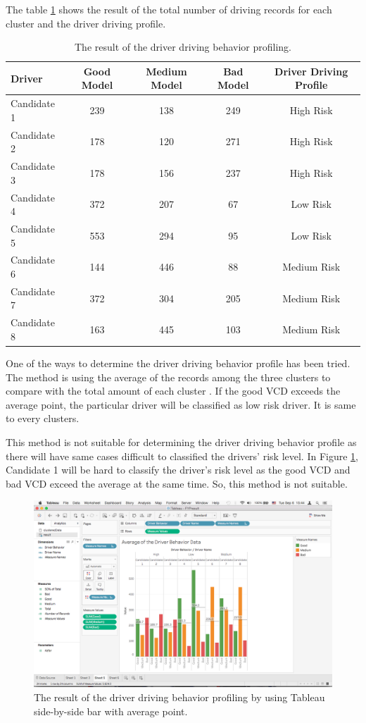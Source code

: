 The table \ref{tbl:result} shows the result of the total number of driving records for each cluster and the driver driving profile.

\begin{table}[h!]
\begin{tabular}{|l|c|c|c|c|}
\hline
Driver & Good Model & Medium Model & Bad Model & Driver Driving Profile \\

\hline
Candidate 1 & 239 & 138 & 249 & High Risk\\

\hline
Candidate 2 & 178 & 120 & 271 & High Risk\\
  
\hline
Candidate 3 & 178 & 156 & 237 & High Risk\\

\hline
Candidate 4 & 372 & 207 & 67 & Low Risk\\

\hline
Candidate 5 & 553 & 294 & 95 & Low Risk\\

\hline
Candidate 6 & 144 & 446 & 88 & Medium Risk\\

\hline
Candidate 7 & 372 & 304 & 205 & Medium Risk\\

\hline
Candidate 8 & 163 & 445 & 103 & Medium Risk\\

\hline
\end{tabular}
\label{tbl:result}
\caption{The result of the driver driving behavior profiling.}    
\end{table}

One of the ways to determine the driver driving behavior profile has been tried. The method is using the average of the records among the three clusters to compare with the total amount of each cluster . If the good VCD exceeds the average point, the particular driver will be classified as low risk driver. It is same to every clusters.

This method is not suitable for determining the driver driving behavior profile as there will have same cases difficult to classified the drivers' risk level. In Figure \ref{fig:Tresult}, Candidate 1 will be hard to classify the driver's risk level as the good VCD and bad VCD exceed the average at the same time. So, this method is not suitable.
 
\begin{figure}[hbt!]\centering
\includegraphics[width=.75\textwidth]{image/Tresult}
\caption{The result of the driver driving behavior profiling by using Tableau side-by-side bar with average point.}
\label{fig:Tresult}
\end{figure} 